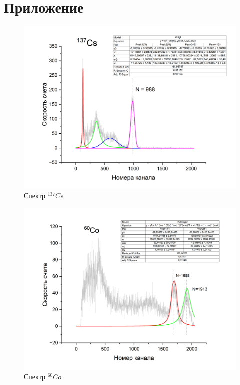 \documentclass[a4paper,12pt]{article} %
\begin{document}
\newpage

\section{Приложение}

\begin{figure}[h!]
    \centering
    \includegraphics[scale=0.5]{cs.png}
    \caption{Спектр $^{137}Cs$}    
\end{figure}

\begin{figure}[h!]
    \centering
    \includegraphics[scale=0.5]{co.png}
    \caption{Спектр $^{60}Co$}
\end{figure}
\end{document}
